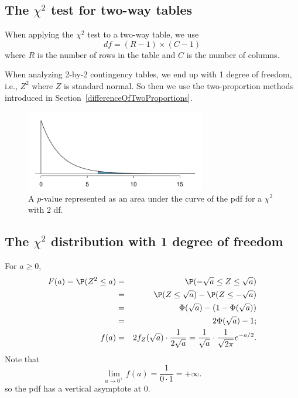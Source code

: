 

\subsection{The $\chi^2$ test for two-way tables}

\begin{termBox}{
When applying the $\chi^2$ test to a two-way table, we use
$$ df = (R-1)\times (C-1) $$
where $R$ is the number of rows in the table and $C$ is the number of columns.}
\end{termBox}

\begin{tipBox}{
When analyzing 2-by-2 contingency tables, we end up with 1 degree of freedom, i.e., $Z^2$ where $Z$ is standard normal. So then we use the two-proportion methods introduced in Section~\ref{differenceOfTwoProportions}.}
\end{tipBox}

\begin{figure}%
\centering
\includegraphics[width=0.7\textwidth]{ch_inference_for_props/figures/googleHTForDiffAlgPerformancePValue/googleHTForDiffAlgPerformancePValue}
\caption{A $p$-value represented as an area under the curve of the pdf for a $\chi^2$ with 2 df.}
\label{googleHTForDiffAlgPerformancePValue}
\end{figure}


\subsection{The $\chi^2$ distribution with 1 degree of freedom}

For $a\ge 0$,
\begin{eqnarray*}
	F(a) = \P(Z^2\le a) &=& \P(-\sqrt{a}\le Z\le\sqrt{a}) \\
	&=& \P(Z\le\sqrt{a})-\P(Z\le-\sqrt{a})\\
	&=& \Phi(\sqrt{a}) - (1-\Phi(\sqrt{a}))\\
	&=& 2\Phi(\sqrt{a})-1;\\
	f(a) &=& 2f_Z(\sqrt{a})\cdot \frac1{2\sqrt{a}} = \frac1{\sqrt{a}}\cdot\frac1{\sqrt{2\pi}} e^{-a/2}.
\end{eqnarray*}
Note that
\[
	\lim_{a\to 0^+} f(a) = \frac1{0\cdot 1}=+\infty.
\]
so the pdf has a vertical asymptote at $0$.

